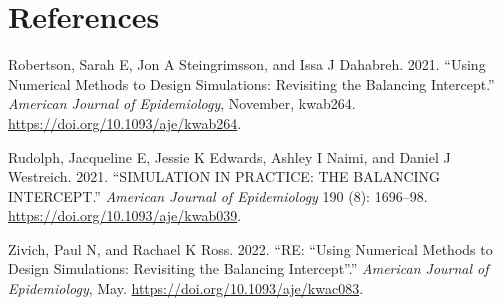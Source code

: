 \documentclass[
]{article}
\newlength{\cslhangindent}
\newlength{\cslentryspacingunit} %
\newenvironment{CSLReferences}[2] %
 {%
  \setlength{\parindent}{0pt}
  \ifodd #1
  \let\oldpar\par
  \def\par{\hangindent=\cslhangindent\oldpar}
  \fi
  \setlength{\parskip}{#2\cslentryspacingunit}
 }%
 {}
\begin{document}
\hypertarget{references}{%
\section*{References}\label{references}}

\hypertarget{refs}{}
\begin{CSLReferences}{1}{0}
\leavevmode{}%
Robertson, Sarah E, Jon A Steingrimsson, and Issa J Dahabreh. 2021.
{``Using Numerical Methods to Design Simulations: Revisiting the
Balancing Intercept.''} \emph{American Journal of Epidemiology},
November, kwab264. \url{https://doi.org/10.1093/aje/kwab264}.

\leavevmode{}%
Rudolph, Jacqueline E, Jessie K Edwards, Ashley I Naimi, and Daniel J
Westreich. 2021. {``SIMULATION IN PRACTICE: THE BALANCING INTERCEPT.''}
\emph{American Journal of Epidemiology} 190 (8): 1696--98.
\url{https://doi.org/10.1093/aje/kwab039}.

\leavevmode{}%
Zivich, Paul N, and Rachael K Ross. 2022. {``RE: {``}Using Numerical
Methods to Design Simulations: Revisiting the Balancing
Intercept{''}.''} \emph{American Journal of Epidemiology}, May.
\url{https://doi.org/10.1093/aje/kwac083}.

\end{CSLReferences}
\end{document}
